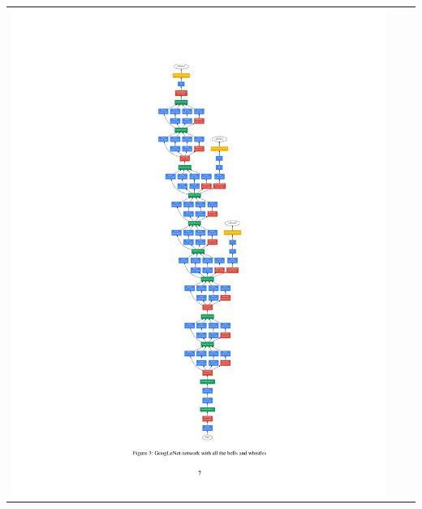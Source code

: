 \documentclass[c,8pt]{beamer}
\begin{document}
\begin{frame}{}{} %

\begin{tabular}{cp{1cm}c}
\includegraphics[clip,trim=230 80 220 80,scale=0.3]{excerpts/szegedy_2014_page_7.pdf}
&&

\end{tabular}
\end{frame}
\end{document}
